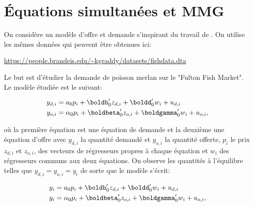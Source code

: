 \section{Équations simultanées et MMG}

On considère un modèle d'offre et demande s'inspirant du travail de \cite{AGI_RES_2000}. 
On utilise les mêmes données qui peuvent être obtenues ici:

\medskip

\url{https://people.brandeis.edu/~kgraddy/datasets/fishdata.dta}

\medskip

Le but est d'étudier la demande de poisson merlan sur le "Fulton Fish Market". 
Le modèle étudiée est le suivant:

\begin{align*}
	y_{d, i} & = a_0 p_i + \boldb_0^\prime z_{d, i} +  \boldd_0^\prime w_i + u_{d, i}\\
	y_{o, i} & = \alpha_0 p_i + \boldbeta_0^\prime z_{o, i} + \boldgamma_0^\prime w_i + u_{o, i},
\end{align*}

où la première équation est une équation de demande et la deuxième une équation d'offre avec $y_{d, i}$ la quantité demandé
et $y_{o, i}$ la quantité offerte, $p_i$ le prix $z_{d, i}$ et $z_{o, i}$, des 
vecteurs de régresseurs propres à chaque équation et $w_i$ des régresseurs communs aux deux équations.
On observe les quantités à l'équilibre telles que $y_{d, i} = y_{o, i} = y_i$ de sorte que le modèle
s'écrit:

\begin{align*}
	y_i & = a_0 p_i + \boldb_0^\prime z_{d, i} +  \boldd_0^\prime w_i + u_{d, i}\\
	y_i & = \alpha_0 p_i + \boldbeta_0^\prime z_{o, i} + \boldgamma_0^\prime w_i + u_{o, i},
\end{align*}













 
